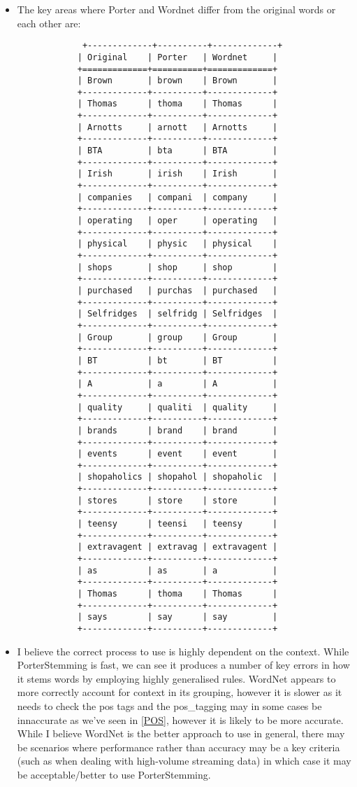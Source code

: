 \documentclass{scrreprt}
\begin{document}
\begin{enumerate}
		\begin{itemize}
			\item The key areas where Porter and Wordnet differ from the original words or each other are:
			\begin{verbatim}
			 +-------------+----------+-------------+
			| Original    | Porter   | Wordnet     |
			+=============+==========+=============+
			| Brown       | brown    | Brown       |
			+-------------+----------+-------------+
			| Thomas      | thoma    | Thomas      |
			+-------------+----------+-------------+
			| Arnotts     | arnott   | Arnotts     |
			+-------------+----------+-------------+
			| BTA         | bta      | BTA         |
			+-------------+----------+-------------+
			| Irish       | irish    | Irish       |
			+-------------+----------+-------------+
			| companies   | compani  | company     |
			+-------------+----------+-------------+
			| operating   | oper     | operating   |
			+-------------+----------+-------------+
			| physical    | physic   | physical    |
			+-------------+----------+-------------+
			| shops       | shop     | shop        |
			+-------------+----------+-------------+
			| purchased   | purchas  | purchased   |
			+-------------+----------+-------------+
			| Selfridges  | selfridg | Selfridges  |
			+-------------+----------+-------------+
			| Group       | group    | Group       |
			+-------------+----------+-------------+
			| BT          | bt       | BT          |
			+-------------+----------+-------------+
			| A           | a        | A           |
			+-------------+----------+-------------+
			| quality     | qualiti  | quality     |
			+-------------+----------+-------------+
			| brands      | brand    | brand       |
			+-------------+----------+-------------+
			| events      | event    | event       |
			+-------------+----------+-------------+
			| shopaholics | shopahol | shopaholic  |
			+-------------+----------+-------------+
			| stores      | store    | store       |
			+-------------+----------+-------------+
			| teensy      | teensi   | teensy      |
			+-------------+----------+-------------+
			| extravagent | extravag | extravagent |
			+-------------+----------+-------------+
			| as          | as       | a           |
			+-------------+----------+-------------+
			| Thomas      | thoma    | Thomas      |
			+-------------+----------+-------------+
			| says        | say      | say         |
			+-------------+----------+-------------+
			\end{verbatim}
			\item I believe the correct process to use is highly dependent on the context. While PorterStemming is fast, we can see it produces a number of key errors in how it stems words by employing highly generalised rules. WordNet appears to more correctly account for context in its grouping, however it is slower as it needs to check the pos tags and the pos\_tagging may in some cases be innaccurate as we've seen in \ref{POS}, however it is likely to be more accurate. While I believe WordNet is the better approach to use in general, there may be scenarios where performance rather than accuracy may be a key criteria (such as when dealing with high-volume streaming data) in which case it may be acceptable/better to use PorterStemming.

\end{itemize}
\end{enumerate}
\end{document}
